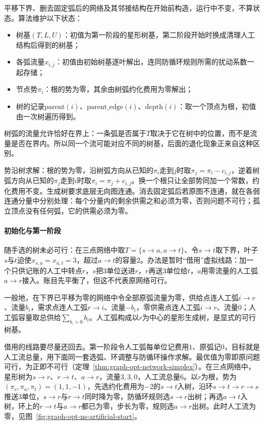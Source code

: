 平移下界、删去固定弧后的网络及其邻接结构在开始前构造，运行中不变，不算状态。算法维护以下状态：
\begin{itemize}
  \item 树基$(T,L,U)$：初值为第一阶段的星形树基，第二阶段开始时换成清理人工结构后得到的树基；
  \item 各弧流量$x_{i,j}$：初值由初始树基逐叶解出，连同防循环规则所需的扰动系数一起存储；
  \item 节点势$\pi_i$：根的势为零，其余由树弧约化费用为零解出；
  \item 树的记录$\mathrm{parent}(i)$、$\mathrm{parent\_edge}(i)$、$\mathrm{depth}(i)$：取一个顶点为根，初值由一次树遍历得到。
\end{itemize}
树弧的流量允许恰好在界上：一条弧是否属于$T$取决于它在树中的位置，而不是流量是否在界内。所以同一个流可能对应不同的树基，后面的退化现象正来自这种区别。

势沿树求解：根的势为零，沿树弧方向从已知的$\pi_i$走到$j$时取$\pi_j=\pi_i-c_{i,j}$，逆着树弧方向从已知的$\pi_j$走到$i$时取$\pi_i=\pi_j+c_{i,j}$。换一个根只让全部势同加一个常数，约化费用不变。生成树要求底层无向图连通。消去固定弧后若原图不连通，就在各弱连通分量中分别处理：每个分量内的剩余供需之和必须为零，否则问题不可行；孤立顶点没有任何弧，它的供需必须为零。

\paragraph{初始化与第一阶段}
随手选的树未必可行：在三点网络中取$T=\{s\to a,a\to t\}$、令$s\to t$取下界，叶子$s$与$t$迫使$x_{s,a}=x_{a,t}=3$，超过$a\to t$的容量$2$。办法是暂时“借用”虚拟线路：加一个只供记账的人工中转点$r$，$s$把$3$单位送进$r$，$r$再送$3$单位给$t$，$a$用零流量的人工弧$a\to r$接入。账目先平衡了，但这不代表原网络可行。

一般地，在下界已平移为零的网络中令全部原弧流量为零，供给点连人工弧$i\to r$、流量$b_i$，需求点连人工弧$r\to i$、流量$-b_i$，零供需点连人工弧$i\to r$、流量$0$；人工弧容量取总供给$\sum_{b_i>0}b_i$。人工弧构成以$r$为中心的星形生成树，是显式的可行树基。

借用的线路要尽量还回去。第一阶段令人工弧每单位记费用$1$、原弧记$0$，目标就是人工流总量，用下面同一套选弧、环调整与防循环操作求解。最优值为零即原问题可行，为正即不可行（定理~\ref{thm:graph-opt-network-simplex}）。在三点网络中，星形树为$s\to r$、$r\to t$、$a\to r$，流量$3,3,0$，人工流总量$6$。以$r$为根，势为$(\pi_s,\pi_a,\pi_t)=(1,1,-1)$，先选约化费用为$-2$的$s\to t$入树，沿环$s\to t\to r\to s$推送$3$单位，$s\to r$与$r\to t$同时降为零，防循环规则选$s\to r$出树；再选$a\to t$入树，环上的$r\to t$与$a\to r$都已为零，步长为零，规则选$a\to r$出树。此时人工流为零，见图~\ref{fig:graph-opt-ns-artificial-start}。

